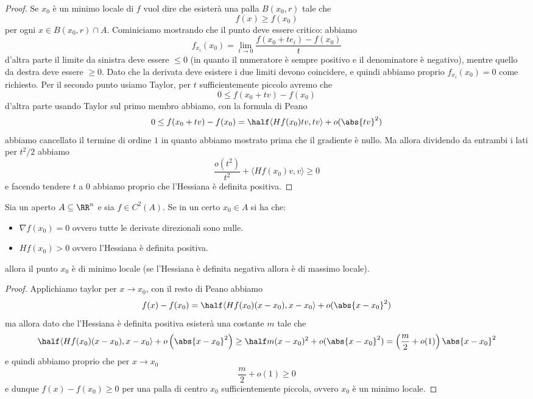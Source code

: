 \documentclass[11pt]{scrartcl}
\begin{document}
	\begin{proof}
		Se $x_0$ è un minimo locale di $f$ vuol dire che esisterà una palla $B(x_0,r)$ tale che
		$$f(x)\ge f(x_0)$$
		per ogni $x\in B(x_0,r)\cap A$. Cominiciamo mostrando che il punto deve essere critico: abbiamo
		$$f_{x_i}(x_0)=\lim_{t\to 0}\frac{f(x_0+te_i)-f(x_0)}{t}$$
		d'altra parte il limite da sinistra deve essere $\le 0$ (in quanto il numeratore è sempre positivo e il denominatore è negativo), mentre quello da destra deve essere $\ge 0$. Dato che la derivata deve esistere i due limiti devono coincidere, e quindi abbiamo proprio $f_{x_i}(x_0)=0$ come richiesto. Per il secondo punto usiamo Taylor, per $t$ sufficientemente piccolo avremo che
		$$0\le f(x_0+tv)-f(x_0)$$
		d'altra parte usando Taylor sul primo membro abbiamo, con la formula di Peano
		$$0\le f(x_0+tv)-f(x_0) = \half \langle Hf(x_0)tv,tv\rangle + o(\abs{tv}^2)$$ 
		abbiamo cancellato il termine di ordine $1$ in quanto abbiamo mostrato prima che il gradiente è nullo. Ma allora dividendo da entrambi i lati per $t^2/2$ abbiamo
		$$\frac{o(t^2)}{t^2}+\langle Hf(x_0)v,v\rangle \ge 0$$
		e facendo tendere $t$ a $0$ abbiamo proprio che l'Hessiana è definita positiva.
	\end{proof}
	\begin{theorem}
		Sia un aperto $A\subseteq\RR^n$ e sia $f\in C^2(A)$. Se in un certo $x_0\in A$ si ha che:
		\begin{itemize}
			\item $\nabla f(x_0)=0$ ovvero tutte le derivate direzionali sono nulle.
			\item $Hf(x_0)>0$ ovvero l'Hessiana è definita positiva.
		\end{itemize}
		allora il punto $x_0$ è di minimo locale (se l'Hessiana è definita negativa allora è di massimo locale).
	\end{theorem}
	\begin{proof}
		Applichiamo taylor per $x\to x_0$, con il resto di Peano abbiamo
		$$f(x)-f(x_0)=\half \langle Hf(x_0)(x-x_0),x-x_0\rangle+o(\abs{x-x_0}^2)$$
		ma allora dato che l'Hessiana è definita positiva esisterà una costante $m$ tale che
		$$\half \langle Hf(x_0)(x-x_0),x-x_0\rangle+o\left(\abs{x-x_0}^2\right)\ge \half m (x-x_0)^2+o(\abs{x-x_0}^2)=\left(\frac{m}{2}+o(1)\right)\abs{x-x_0}^2$$
		e quindi abbiamo proprio che per $x\to x_0$
		$$\frac{m}{2}+o(1)\ge 0$$
		e dunque $f(x)-f(x_0)\ge 0$ per una palla di centro $x_0$ sufficientemente piccola, ovvero $x_0$ è un minimo locale.
	\end{proof}
	
\end{document}
